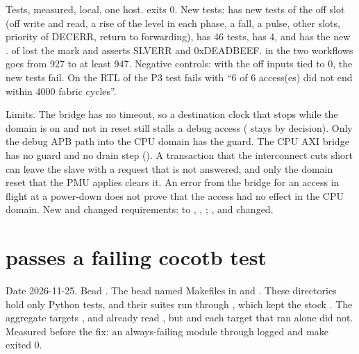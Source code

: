 \begin{record}

Tests, measured, local, one host.  exits 0. New tests:  has new tests of the off slot (off write and read, a rise of the level in each phase, a fall, a pulse, other slots, priority of DECERR, return to forwarding),  has 46 tests,  has 4, and  has the new .  of  lost the mark  and asserts SLVERR and 0xDEADBEEF.  in the two workflows goes from 927 to at least 947. Negative controls: with the off inputs tied to 0, the new tests fail. On the RTL of  the P3 test fails with ``6 of 6 access(es) did not end within 4000 fabric cycles''.

\end{record}

\begin{record}

Limits. The bridge has no timeout, so a destination clock that stops while the domain is on and not in reset still stalls a debug access ( stays  by decision). Only the debug APB path into the CPU domain has the guard. The CPU AXI bridge  has no guard and no drain step (). A transaction that the interconnect cuts short can leave the slave with a request that is not answered, and only the domain reset that the PMU applies clears it. An error from the bridge for an access in flight at a power-down does not prove that the access had no effect in the CPU domain. New and changed requirements:  to , , ; ,  and  changed.

\end{record}

\section{ passes a failing cocotb test}\label{cr:defect:sim-makefile-false-pass}

\begin{record}

Date 2026-11-25. Bead . The bead named Makefiles in  and . These directories hold only Python tests, and their suites run through , which kept the stock . The aggregate targets ,  and  already read , but  and each target that ran alone did not. Measured before the fix: an always-failing module through  logged  and make exited 0.

\end{record}

